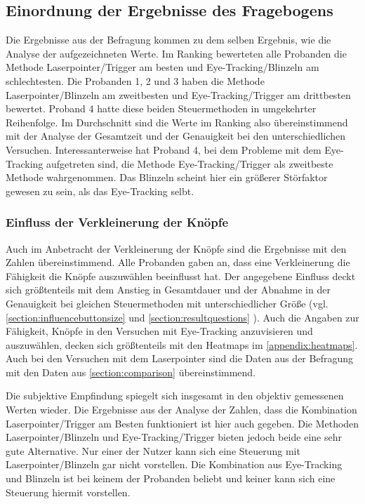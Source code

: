 \subsection{Einordnung der Ergebnisse des Fragebogens}
Die Ergebnisse aus der Befragung kommen zu dem selben Ergebnis, wie die Analyse der aufgezeichneten Werte. Im Ranking bewerteten alle Probanden die Methode Laserpointer/Trigger am besten und Eye-Tracking/Blinzeln am schlechtesten. Die Probanden 1, 2 und 3 haben die Methode Laserpointer/Blinzeln am zweitbesten und Eye-Tracking/Trigger am drittbesten bewertet. Proband 4 hatte diese beiden Steuermethoden in umgekehrter Reihenfolge. Im Durchschnitt sind die Werte im Ranking also übereinstimmend mit der Analyse der Gesamtzeit und der Genauigkeit bei den unterschiedlichen Versuchen. Interessanterweise hat Proband 4, bei dem Probleme mit dem Eye-Tracking aufgetreten sind, die Methode Eye-Tracking/Trigger als zweitbeste Methode wahrgenommen. Das Blinzeln scheint hier ein größerer Störfaktor gewesen zu sein, als das Eye-Tracking selbt. 

\subsubsection{Einfluss der Verkleinerung der Knöpfe} 
Auch im Anbetracht der Verkleinerung der Knöpfe sind die Ergebnisse mit den Zahlen übereinstimmend. Alle Probanden gaben an, dass eine Verkleinerung die Fähigkeit die Knöpfe auszuwählen beeinflusst hat. Der angegebene Einfluss deckt sich größtenteils mit dem Anstieg in Gesamtdauer und der Abnahme in der Genauigkeit bei gleichen Steuermethoden mit unterschiedlicher Größe (vgl. \autoref{section:influencebuttonsize} und \autoref{section:resultquestions} ). Auch die Angaben zur Fähigkeit, Knöpfe in den Versuchen mit Eye-Tracking anzuvisieren und auszuwählen, decken sich größtenteils mit den Heatmaps im \autoref{appendix:heatmaps}. Auch bei den Versuchen mit dem Laserpointer sind die Daten aus der Befragung mit den Daten aus \autoref{section:comparison} übereinstimmend. 

Die subjektive Empfindung spiegelt sich insgesamt in den objektiv gemessenen Werten wieder. Die Ergebnisse aus der Analyse der Zahlen, dass die Kombination Laserpointer/Trigger am Besten funktioniert ist hier auch gegeben. Die Methoden Laserpointer/Blinzeln und Eye-Tracking/Trigger bieten jedoch beide eine sehr gute Alternative. Nur einer der Nutzer kann sich eine Steuerung mit Laserpointer/Blinzeln gar nicht vorstellen. Die Kombination aus Eye-Tracking und Blinzeln ist bei keinem der Probanden beliebt und keiner kann sich eine Steuerung hiermit vorstellen.

